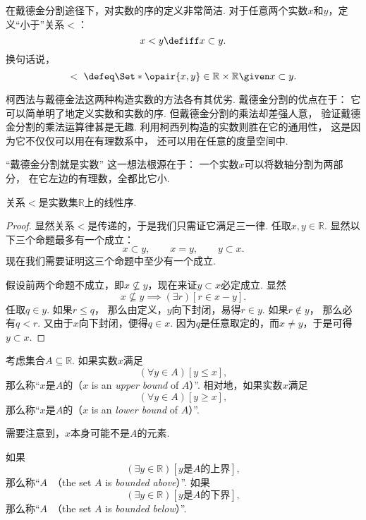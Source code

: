 在戴德金分割途径下，对实数的序的定义非常简洁.
对于任意两个实数\(x\)和\(y\)，定义“小于”关系\(<\)：\[
	x < y \defiff x \subset y.
\]
换句话说，\[
	<\ \defeq \Set*{ \opair{x,y}\in\mathbb{R}\times\mathbb{R} \given x \subset y }.
\]

柯西法与戴德金法这两种构造实数的方法各有其优劣.
戴德金分割的优点在于：
它可以简单明了地定义实数和实数的序.
但戴德金分割的乘法却差强人意，
验证戴德金分割的乘法运算律甚是无趣.
利用柯西列构造的实数则胜在它的通用性，
这是因为它不仅仅可以用在有理数系中，
还可以用在任意的度量空间中.

“戴德金分割就是实数”
这一想法根源在于：
一个实数\(x\)可以将数轴分割为两部分，
在它左边的有理数，全都比它小.

\begin{theorem}
关系\(<\)是实数集\(\mathbb{R}\)上的线性序.
\begin{proof}
显然关系\(<\)是传递的，于是我们只需证它满足三一律.
任取\(x,y\in\mathbb{R}\).
显然以下三个命题最多有一个成立：\[
	x \subset y, \qquad
	x = y, \qquad
	y \subset x.
\]
现在我们需要证明这三个命题中至少有一个成立.

假设前两个命题不成立，即\(x \nsubseteq y\)，现在来证\(y \subset x\)必定成立.
显然\[
	x \nsubseteq y
	\implies
	(\exists r)[r \in x-y].
\]
任取\(q \in y\).
如果\(r \leq q\)，
那么由定义，\(y\)向下封闭，易得\(r \in y\).
如果\(r \notin y\)，
那么必有\(q < r\).
又由于\(x\)向下封闭，便得\(q \in x\).
因为\(q\)是任意取定的，而\(x \neq y\)，于是可得\(y \subset x\).
\end{proof}
\end{theorem}

考虑集合\(A \subseteq \mathbb{R}\).
如果实数\(x\)满足\[
	(\forall y \in A)[y \leq x],
\]
那么称“\(x\)是\(A\)的（\(x\) is an \emph{upper bound} of \(A\)）”.
相对地，如果实数\(x\)满足\[
	(\forall y \in A)[y \geq x],
\]
那么称“\(x\)是\(A\)的（\(x\) is an \emph{lower bound} of \(A\)）”.

需要注意到，\(x\)本身可能不是\(A\)的元素.

如果\[
	(\exists y\in\mathbb{R})
	[\text{\(y\)是\(A\)的上界}],
\]
那么称“\(A\)~（the set \(A\) is \emph{bounded above}）”.
如果\[
	(\exists y\in\mathbb{R})
	[\text{\(y\)是\(A\)的下界}],
\]
那么称“\(A\)~（the set \(A\) is \emph{bounded below}）”.

